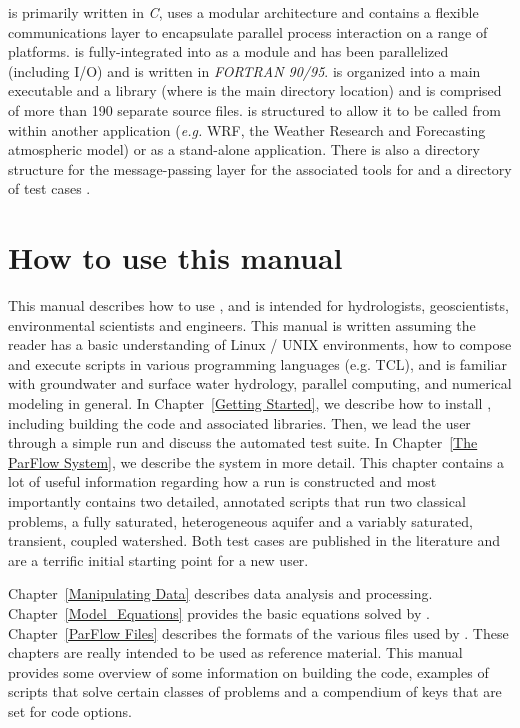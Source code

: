 \parflow{} is primarily written in \emph{C}, uses a modular
architecture and contains a flexible communications layer to
encapsulate parallel process interaction on a range of platforms.
 is fully-integrated into \parflow{} as a module and has
been parallelized (including I/O) and is written in \emph{FORTRAN
  90/95}.  \parflow{} is organized into a main executable
 and a library
 (where  is
the main directory location) and is comprised of more than 190
separate source files.  \parflow{} is structured to allow it to be
called from within another application (\emph{e.g.} WRF, the Weather Research 
and Forecasting atmospheric model) or as a
stand-alone application.  There is also a directory structure for the
message-passing layer  for the
associated tools  for 
 and a directory of test cases
.

\section{How to use this manual}
\label{how to}
This manual describes how to use \parflow{}, and is intended for
hydrologists, geoscientists, environmental scientists and engineers. 
This manual is written assuming the reader has a basic understanding
of Linux / UNIX environments, how to compose and execute scripts in various 
programming languages (e.g. TCL), and is familiar with groundwater and 
surface water hydrology, parallel computing, and numerical modeling in general.
In Chapter~\ref{Getting Started}, we describe how to install \parflow{}, including
building the code and associated libraries. Then, we lead the user through a simple
\parflow{} run and discuss the automated test suite.  In
Chapter~\ref{The ParFlow System}, we describe the \parflow{} system in
more detail.  This chapter contains a lot of useful information regarding how a run is 
constructed and most importantly contains two detailed, annotated scripts that run two
classical \parflow{} problems, a fully saturated, heterogeneous aquifer and a variably 
saturated, transient, coupled watershed.  Both test cases are published in the literature
and are a terrific initial starting point for a new \parflow{} user.

Chapter~\ref{Manipulating Data} describes data analysis and processing. Chapter~\ref{Model_Equations} provides the basic equations solved
by \parflow{}.  Chapter~\ref{ParFlow Files} describes the formats of the
various files used by \parflow{}.  These chapters are really intended to be used as reference material. 
This manual provides some overview of \parflow{}
some information on building the code, examples of scripts that solve certain classes of
problems and a compendium of keys that are set for code options. 

